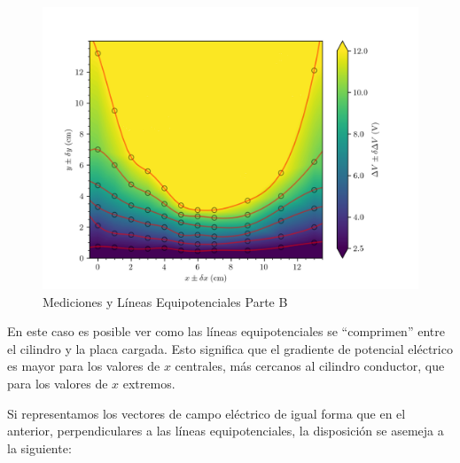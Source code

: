 \documentclass{article}
\begin{document}
\begin{figure}[H]
  \hspace{-0.1cm}\includegraphics[scale=0.2]{plot2.png}
  \caption{Mediciones y Líneas Equipotenciales Parte B}
\end{figure}

En este caso es posible ver como las líneas equipotenciales se ``comprimen'' entre el cilindro y la placa cargada. Esto significa que el gradiente de potencial eléctrico es mayor para los valores de $x$ centrales, más cercanos al cilindro conductor, que para los valores de $x$ extremos.

Si representamos los vectores de campo eléctrico de igual forma que en el anterior, perpendiculares a las líneas equipotenciales, la disposición se asemeja a la siguiente:

\phantom{x}
\end{document}
